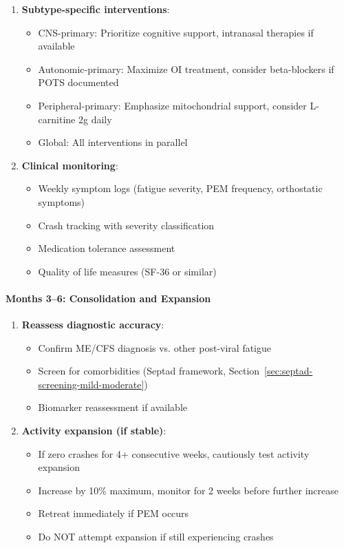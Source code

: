 \begin{protocol}
\begin{enumerate}
    \item \textbf{Subtype-specific interventions}:
    \begin{itemize}
        \item CNS-primary: Prioritize cognitive support, intranasal therapies if available
        \item Autonomic-primary: Maximize OI treatment, consider beta-blockers if POTS documented
        \item Peripheral-primary: Emphasize mitochondrial support, consider L-carnitine 2g daily
        \item Global: All interventions in parallel
    \end{itemize}

    \item \textbf{Clinical monitoring}:
    \begin{itemize}
        \item Weekly symptom logs (fatigue severity, PEM frequency, orthostatic symptoms)
        \item Crash tracking with severity classification
        \item Medication tolerance assessment
        \item Quality of life measures (SF-36 or similar)
    \end{itemize}
\end{enumerate}

\paragraph{Months 3--6: Consolidation and Expansion}

\begin{enumerate}
    \item \textbf{Reassess diagnostic accuracy}:
    \begin{itemize}
        \item Confirm ME/CFS diagnosis vs. other post-viral fatigue
        \item Screen for comorbidities (Septad framework, Section~\ref{sec:septad-screening-mild-moderate})
        \item Biomarker reassessment if available
    \end{itemize}

    \item \textbf{Activity expansion (if stable)}:
    \begin{itemize}
        \item If zero crashes for 4+ consecutive weeks, cautiously test activity expansion
        \item Increase by 10\% maximum, monitor for 2 weeks before further increase
        \item Retreat immediately if PEM occurs
        \item Do NOT attempt expansion if still experiencing crashes
    \end{itemize}


\end{enumerate}
\end{protocol}
